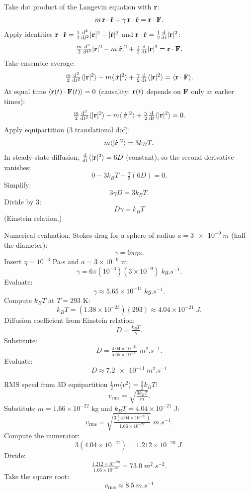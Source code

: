\documentclass[11pt]{article}
\newcommand{\de}{\mathrm{d}}
\begin{document}
Take dot product of the Langevin equation with $\vb r$:
\[
m\,\vb r\cdot\ddot{\vb r} + \gamma\,\vb r\cdot\dot{\vb r} = \vb r\cdot\vb F.
\]
Apply identities $\vb r\cdot\ddot{\vb r} = \tfrac{1}{2}\tfrac{\de^2}{\de t^2}|\vb r|^2 - |\dot{\vb r}|^2$ and $\vb r\cdot\dot{\vb r} = \tfrac{1}{2}\tfrac{\de}{\de t}|\vb r|^2$:
\[
\tfrac{m}{2}\tfrac{\de^2}{\de t^2}|\vb r|^2 - m|\dot{\vb r}|^2 + \tfrac{\gamma}{2}\tfrac{\de}{\de t}|\vb r|^2 = \vb r\cdot\vb F.
\]
Take ensemble average:
\[
\tfrac{m}{2}\tfrac{\de^2}{\de t^2}\langle|\vb r|^2\rangle - m\langle|\dot{\vb r}|^2\rangle + \tfrac{\gamma}{2}\tfrac{\de}{\de t}\langle|\vb r|^2\rangle = \langle\vb r\cdot\vb F\rangle.
\]
At equal time $\langle\vb r(t)\cdot\vb F(t)\rangle = 0$ (causality: $\vb r(t)$ depends on $\vb F$ only at earlier times):
\[
\tfrac{m}{2}\tfrac{\de^2}{\de t^2}\langle|\vb r|^2\rangle - m\langle|\dot{\vb r}|^2\rangle + \tfrac{\gamma}{2}\tfrac{\de}{\de t}\langle|\vb r|^2\rangle = 0.
\]
Apply equipartition (3 translational dof):
\[
m\langle|\dot{\vb r}|^2\rangle = 3k_B T.
\]
In steady-state diffusion, $\tfrac{\de}{\de t}\langle|\vb r|^2\rangle = 6D$ (constant), so the second derivative vanishes:
\[
0 - 3k_B T + \tfrac{\gamma}{2}(6D) = 0.
\]
Simplify:
\[
3\gamma D = 3 k_B T.
\]
Divide by 3:
\[
\boxed{\;D\gamma = k_B T\;}
\]
(Einstein relation.)

Numerical evaluation. Stokes drag for a sphere of radius $a = \SI{3e-9}{m}$ (half the diameter):
\[
\gamma = 6\pi\eta a.
\]
Insert $\eta = 10^{-3}$ Pa$\cdot$s and $a = 3\times 10^{-9}$ m:
\[
\gamma = 6\pi(10^{-3})(3\times 10^{-9}) \;\si{kg.s^{-1}}.
\]
Evaluate:
\[
\gamma \approx 5.65\times 10^{-11}\;\si{kg.s^{-1}}.
\]
Compute $k_B T$ at $T=293$ K:
\[
k_B T = (1.38\times 10^{-23})(293) \approx 4.04\times 10^{-21}\;\si{J}.
\]
Diffusion coefficient from Einstein relation:
\[
D = \tfrac{k_B T}{\gamma}.
\]
Substitute:
\[
D = \tfrac{4.04\times 10^{-21}}{5.65\times 10^{-11}}\;\si{m^2.s^{-1}}.
\]
Evaluate:
\[
\boxed{\;D \approx \SI{7.2e-11}{m^2.s^{-1}}\;}
\]

RMS speed from 3D equipartition $\tfrac{1}{2}m\langle v^2\rangle = \tfrac{3}{2}k_BT$:
\[
v_\text{rms} = \sqrt{\tfrac{3 k_B T}{m}}.
\]
Substitute $m = 1.66\times 10^{-22}$ kg and $k_BT = 4.04\times 10^{-21}$ J:
\[
v_\text{rms} = \sqrt{\tfrac{3(4.04\times 10^{-21})}{1.66\times 10^{-22}}}\;\si{m.s^{-1}}.
\]
Compute the numerator:
\[
3(4.04\times 10^{-21}) = 1.212\times 10^{-20}\;\si{J}.
\]
Divide:
\[
\tfrac{1.212\times 10^{-20}}{1.66\times 10^{-22}} = 73.0\;\si{m^2.s^{-2}}.
\]
Take the square root:
\[
\boxed{\;v_\text{rms} \approx \SI{8.5}{m.s^{-1}}\;}
\]
\end{document}

